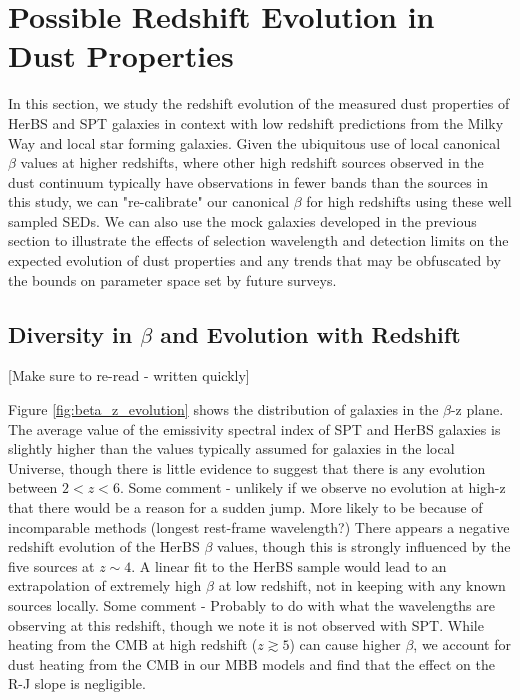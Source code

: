 \section{Possible Redshift Evolution in Dust Properties}
\label{sec:redshift_evolution}

In this section, we study the redshift evolution of the measured dust properties of HerBS and SPT galaxies in context with low redshift predictions from the Milky Way and local star forming galaxies. Given the ubiquitous use of local canonical $\beta$ values at higher redshifts, where other high redshift sources observed in the dust continuum typically have observations in fewer bands than the sources in this study, we can "re-calibrate" our canonical $\beta$ for high redshifts using these well sampled SEDs. We can also use the mock galaxies developed in the previous section to illustrate the effects of selection wavelength and detection limits on the expected evolution of dust properties and any trends that may be obfuscated by the bounds on parameter space set by future surveys. 

\subsection{Diversity in $\beta$ and Evolution with Redshift}

[Make sure to re-read - written quickly]

Figure \ref{fig:beta_z_evolution} shows the distribution of galaxies in the $\beta$-z plane. The average value of the emissivity spectral index of SPT and HerBS galaxies is slightly higher than the values typically assumed for galaxies in the local Universe, though there is little evidence to suggest that there is any evolution between $2 < z < 6$. {\color{red} Some comment - unlikely if we observe no evolution at high-z that there would be a reason for a sudden jump. More likely to be because of incomparable methods (longest rest-frame wavelength?)} There appears a negative redshift evolution of the HerBS $\beta$ values, though this is strongly influenced by the five sources at $z \sim 4$. A linear fit to the HerBS sample would lead to an extrapolation of extremely high $\beta$ at low redshift, not in keeping with any known sources locally. {\color{red} Some comment - Probably to do with what the wavelengths are observing at this redshift, though we note it is not observed with SPT.} While heating from the CMB at high redshift ($z \gtrsim 5$) can cause higher $\beta$, we account for dust heating from the CMB in our MBB models and find that the effect on the R-J slope is negligible.

